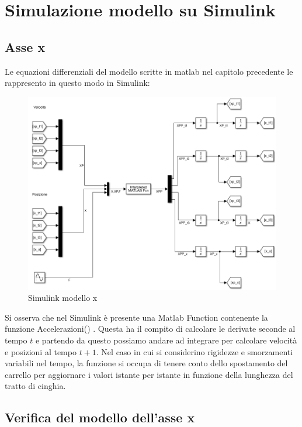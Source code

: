 \documentclass{article}
\begin{document}
\section{Simulazione modello su Simulink}

\subsection{Asse x}

Le equazioni differenziali del modello scritte in matlab nel capitolo precedente le rappresento in questo modo in Simulink:
\begin{figure}[H]
\centering
\includegraphics[width=.8\textwidth]{./simulink/assex/modellox.png}
\caption{ Simulink modello x}
\end{figure}
Si osserva che nel Simulink è presente una Matlab Function contenente la funzione Accelerazioni() . Questa ha il compito di calcolare le derivate seconde al tempo $t$ e partendo da questo possiamo andare ad integrare per calcolare velocità e posizioni al tempo $t+1$.
Nel caso in cui si considerino rigidezze e smorzamenti variabili nel tempo, la funzione si occupa di tenere conto dello spostamento del carrello per aggiornare i valori istante per istante in funzione della lunghezza del tratto di cinghia.
\subsection{Verifica del modello dell'asse x}
\end{document}
